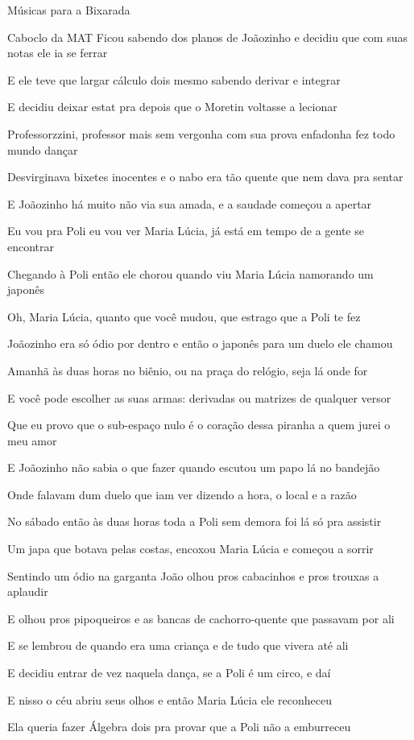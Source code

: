 \begin{secao}{Músicas para a Bixarada}
\begin{subsecao}{Caboclo da MAT}
Ficou sabendo dos planos de Joãozinho e decidiu que com suas notas ele ia se
ferrar

E ele teve que largar cálculo dois mesmo sabendo derivar e integrar

E decidiu deixar estat pra depois que o Moretin voltasse a lecionar

Professorzzini, professor mais sem vergonha com sua prova enfadonha fez todo
mundo dançar

Desvirginava bixetes inocentes e o nabo era tão quente que nem dava pra sentar

E Joãozinho há muito não via sua amada, e a saudade começou a apertar

Eu vou pra Poli eu vou ver Maria Lúcia, já está em tempo de a gente se encontrar

Chegando à Poli então ele chorou quando viu Maria Lúcia namorando um japonês

Oh, Maria Lúcia, quanto que você mudou, que estrago que a Poli te fez

Joãozinho era só ódio por dentro e então o japonês para um duelo ele chamou

Amanhã às duas horas no biênio, ou na praça do relógio, seja lá onde for

E você pode escolher as suas armas: derivadas ou matrizes de qualquer versor

Que eu provo que o sub-espaço nulo é o coração dessa piranha a quem jurei o meu
amor

E Joãozinho não sabia o que fazer quando escutou um papo lá no bandejão

Onde falavam dum duelo que iam ver dizendo a hora, o local e a razão

No sábado então às duas horas toda a Poli sem demora foi lá só pra assistir

Um japa que botava pelas costas, encoxou Maria Lúcia e começou a sorrir

Sentindo um ódio na garganta João olhou pros cabacinhos e pros trouxas a
aplaudir

E olhou pros pipoqueiros e as bancas de cachorro-quente que passavam por ali

E se lembrou de quando era uma criança e de tudo que vivera até ali

E decidiu entrar de vez naquela dança, se a Poli é um circo, e daí

E nisso o céu abriu seus olhos e então Maria Lúcia ele reconheceu

Ela queria fazer Álgebra dois pra provar que a Poli não a emburreceu


\end{subsecao}
\end{secao}
